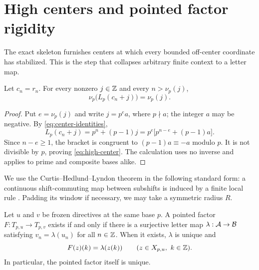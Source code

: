 \section{High centers and pointed factor rigidity}
\label{sec:factors}

The exact skeleton furnishes centers at which every bounded off-center
coordinate has stabilized.  This is the step that collapses arbitrary
finite context to a letter map.

\begin{lemma}
\label{lem:high-center}
  Let $c_n=r_n$.  For every nonzero $j\in\mathbb Z$ and every
  $n>\nu_p(j)$,
  \begin{equation}
    \nu_p\bigl(L_p(c_n+j)\bigr)=\nu_p(j).
    \label{eq:high-center}
  \end{equation}
\end{lemma}

\begin{proof}
  Put $e=\nu_p(j)$ and write $j=p^e a$, where $p\nmid a$; the integer $a$
  may be negative.  By \cref{eq:center-identities},
  \begin{equation}
    L_p(c_n+j)=p^n+(p-1)j
      =p^e\bigl[p^{n-e}+(p-1)a\bigr].
    \label{eq:high-center-factor}
  \end{equation}
  Since $n-e\geq1$, the bracket is congruent to
  $(p-1)a\equiv-a$ modulo $p$.  It is not divisible by $p$, proving
  \cref{eq:high-center}.  The calculation uses no inverse and applies to
  prime and composite bases alike.
\end{proof}

We use the Curtis--Hedlund--Lyndon theorem in the following standard form:
a continuous shift-commuting map between subshifts is induced by a finite
local rule \citep{Hedlund1969}.  Padding its window if necessary, we may
take a symmetric radius $R$.

\begin{theorem}
\label{thm:factor-collapse}
  Let $u$ and $v$ be frozen directives at the same base $p$.  A pointed
  factor $F:T_{p,u}\to T_{p,v}$ exists if and only if there is a
  surjective letter map $\lambda:\mathcal A\to\mathcal B$ satisfying
  $v_n=\lambda(u_n)$ for all $n\in\mathbb Z$.  When it exists, $\lambda$ is
  unique and
  \begin{equation}
    F(z)(k)=\lambda(z(k))
    \qquad(z\in X_{p,u},\ k\in\mathbb Z).
    \label{eq:factor-coordinatewise}
  \end{equation}
  In particular, the pointed factor itself is unique.
\end{theorem}

